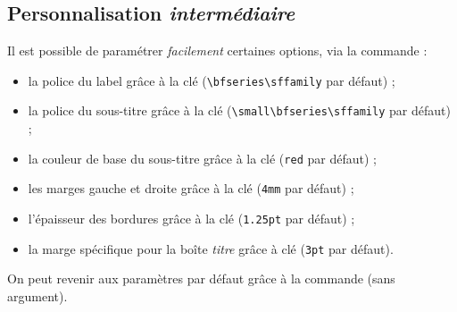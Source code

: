 \documentclass[french,11pt,a4paper]{article}
\begin{document}
\subsection{Personnalisation \textit{intermédiaire}}

Il est possible de paramétrer \textit{facilement} certaines options, via la commande  :

\begin{itemize}
	\item la police du label grâce à la clé \MontreCode{[PoliceTitre=...]} (\verb*|\bfseries\sffamily| par défaut) ;
	\item la police du sous-titre grâce à la clé \MontreCode{[PoliceSousTitre=...]} (\verb*|\small\bfseries\sffamily| par défaut) ;
	\item la couleur de base du sous-titre grâce à la clé \MontreCode{[CouleurSousTitre=...]} (\verb*|red| par défaut) ;
	\item les marges gauche et droite grâce à la clé \MontreCode{[Marge=...]} (\verb*|4mm| par défaut) ;
	\item l'épaisseur des bordures grâce à la clé \MontreCode{[EpaisseurBordure=...]} (\verb*|1.25pt| par défaut) ;
	\item la marge spécifique pour la boîte \textit{titre} grâce à clé \MontreCode{[MargeTitre=...]} (\verb*|3pt| par défaut).
\end{itemize}

\begin{codehigh}[language=latex/latex2,style/main=cyan!10,style/code=cyan!10]
\ParamBoites[%
    Marge=2cm,MargeTitre=2mm,%
    PoliceTitre=\large\bfseries\ttfamily,%
    PoliceSousTitre=\scriptsize\bfseries\sffamily,%
    CouleurSousTitre=orange]
\end{codehigh}

\ParamBoites[Marge=2cm,MargeTitre=2mm,PoliceTitre=\large\bfseries\ttfamily,PoliceSousTitre=\scriptsize\bfseries\sffamily,CouleurSousTitre=orange]

\begin{demohigh}[language=latex/latex2,style/main=cyan!10,style/code=cyan!10]
\begin{BoiteDeDemo}[SousTitre={- Un petit sous-titre -}]
\lipsum[1][1-2]
\end{BoiteDeDemo}
\end{demohigh}

On peut revenir aux paramètres par défaut grâce à la commande  (sans argument).
\end{document}
